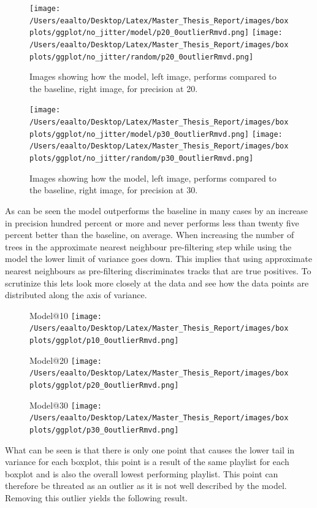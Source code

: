 \documentclass[a4paper,11pt]{kth-mag}
\begin{document}
\begin{figure}
\texttt{[image: /Users/eaalto/Desktop/Latex/Master\_Thesis\_Report/images/boxplots/ggplot/no\_jitter/model/p20\_0outlierRmvd.png]}
\texttt{[image: /Users/eaalto/Desktop/Latex/Master\_Thesis\_Report/images/boxplots/ggplot/no\_jitter/random/p20\_0outlierRmvd.png]}
\caption{Images showing how the model, left image, performs compared to the baseline, right image, for precision at 20.}
\end{figure}

\begin{figure}
\texttt{[image: /Users/eaalto/Desktop/Latex/Master\_Thesis\_Report/images/boxplots/ggplot/no\_jitter/model/p30\_0outlierRmvd.png]}
\texttt{[image: /Users/eaalto/Desktop/Latex/Master\_Thesis\_Report/images/boxplots/ggplot/no\_jitter/random/p30\_0outlierRmvd.png]}
\caption{Images showing how the model, left image, performs compared to the baseline, right image, for precision at 30.}
\end{figure}

As can be seen the model outperforms the baseline in many cases by an increase in precision hundred percent or more and never performs less than twenty five percent better than the baseline, on average. 
When increasing the number of trees in the approximate nearest neighbour pre-filtering step while using the model the lower limit of variance goes down. This implies that using approximate nearest neighbours as pre-filtering discriminates tracks that are true positives. To scrutinize this lets look more closely at the data and see how the data points are distributed along the axis of variance.

\begin{figure}
Model@10
\texttt{[image: /Users/eaalto/Desktop/Latex/Master\_Thesis\_Report/images/boxplots/ggplot/p10\_0outlierRmvd.png]}

Model@20
\texttt{[image: /Users/eaalto/Desktop/Latex/Master\_Thesis\_Report/images/boxplots/ggplot/p20\_0outlierRmvd.png]}

Model@30
\texttt{[image: /Users/eaalto/Desktop/Latex/Master\_Thesis\_Report/images/boxplots/ggplot/p30\_0outlierRmvd.png]}

\end{figure}

What can be seen is that there is only one point that causes the lower tail in variance for each boxplot, this point is a result of the same playlist for each boxplot and is also the overall lowest performing playlist. This point can therefore be threated as an outlier as it is not well described by the model. Removing this outlier yields the following result.
\end{document}
